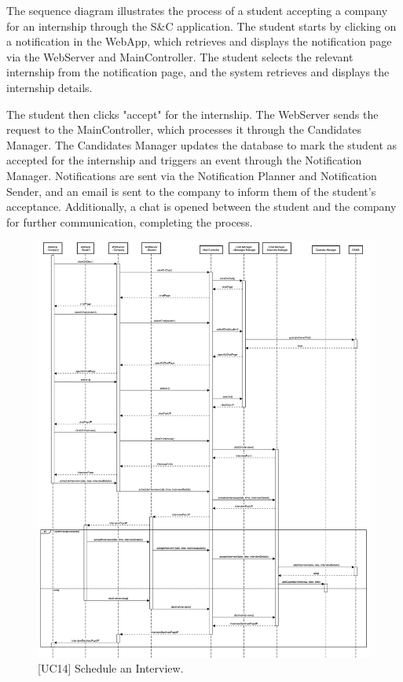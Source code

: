 The sequence diagram illustrates the process of a student accepting a company for an internship through the S\&C application. The student starts by clicking on a notification in the WebApp, which retrieves and displays the notification page via the WebServer and MainController. The student selects the relevant internship from the notification page, and the system retrieves and displays the internship details.

The student then clicks "accept" for the internship. The WebServer sends the request to the MainController, which processes it through the Candidates Manager. The Candidates Manager updates the database to mark the student as accepted for the internship and triggers an event through the Notification Manager. Notifications are sent via the Notification Planner and Notification Sender, and an email is sent to the company to inform them of the student's acceptance. Additionally, a chat is opened between the student and the company for further communication, completing the process. 

\begin{figure}[htbp]
    \centering
    \includegraphics[width=\linewidth]{DD/Images/sequenceDiagrams/scheduleInterview.png}
    \caption{[UC14] Schedule an Interview.}
    \label{fig:scheduleInterview_immagine}
\end{figure}
\clearpage


